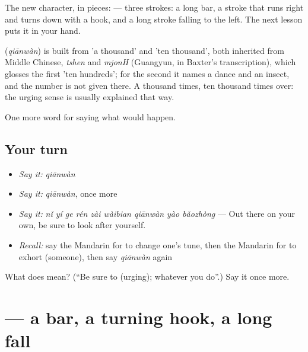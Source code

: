 The new character, in pieces:  — three strokes: a long bar, a stroke that runs right and turns down with a hook, and a long stroke falling to the left. The next lesson puts it in your hand.

\begin{cousinweb}
\textbf{} (\emph{qiānwàn}) is built from  'a thousand' and  'ten thousand', both inherited from Middle Chinese, \emph{tshen} and \emph{mjonH} (Guangyun, in Baxter's transcription), which glosses the first 'ten hundreds'; for the second it names a dance and an insect, and the number is not given there. A thousand times, ten thousand times over: the urging sense is usually explained that way.
\end{cousinweb}

\begin{grammarlens}[title={What you've built}]
One more word for saying what would happen.
\end{grammarlens}

\subsection*{Your turn}
\begin{itemize}
\raggedright
  \item \emph{Say it:} \emph{qiānwàn}
  \item \emph{Say it:} \emph{qiānwàn}, once more
  \item \emph{Say it:} \emph{nǐ yí ge rén zài wàibian qiānwàn yào bǎozhòng} — Out there on your own, be sure to look after yourself.
  \item \emph{Recall:} say the Mandarin for to change one's tune, then the Mandarin for to exhort (someone), then say \emph{qiānwàn} again
\end{itemize}

\begin{tcolorbox}[breakable,colback=teal!4,colframe=teal!35!black,title={Before you move on}]
What does  mean? (\textquotedblleft{}Be sure to (urging); whatever you do\textquotedblright{}.) Say it once more.
\end{tcolorbox}
\section[\texorpdfstring{\zh{万} (wàn)}{万 (wàn)}]{ — a bar, a turning hook, a long fall}

\label{lesson:ZH-W393-wan-myriad}



